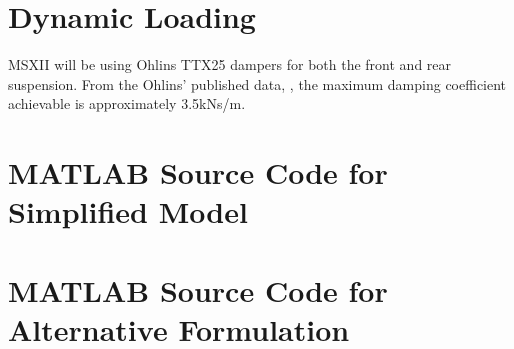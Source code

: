 \documentclass[12pt]{article}
\begin{document}
\section{Dynamic Loading}
MSXII will be using Ohlins TTX25 dampers for both the front and rear suspension. From the Ohlins' published data, \cite{ohlins}, the maximum damping coefficient achievable is approximately 3.5kNs/m. 

\pagebreak
{}


\pagebreak
\appendix
\section{MATLAB Source Code for Simplified Model}
\label{app:simple}

\pagebreak
\section{MATLAB Source Code for Alternative Formulation}
\label{app:alternative}

\end{document}
